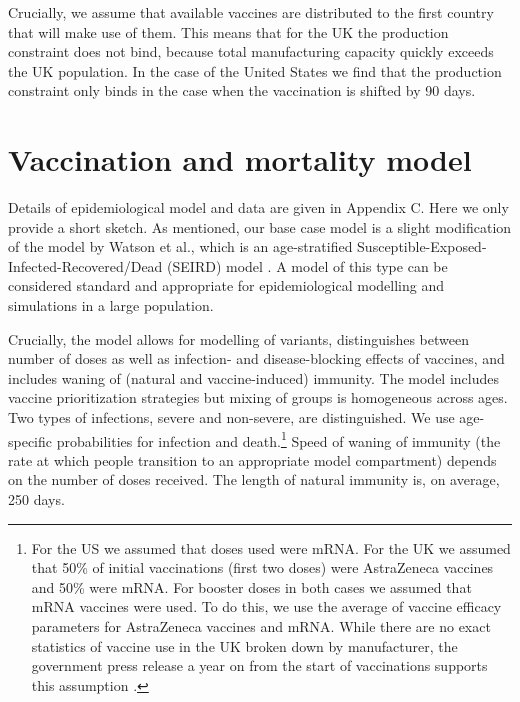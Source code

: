 \documentclass{article}
\begin{document}
Crucially, we assume that available vaccines are distributed to the first country that will make use of them. This means that for the UK the production constraint does not bind, because total manufacturing capacity quickly exceeds the UK population. In the case of the United States we find that the production constraint only binds in the case when the vaccination is shifted by 90 days.

\section{Vaccination and mortality model}\label{vaccination-and-mortality-model}

Details of epidemiological model and data are given in Appendix C. Here we only provide a short sketch. As mentioned, our base case model is a slight modification of the model by Watson et al., which is an age-stratified Susceptible-Exposed-Infected-Recovered/Dead (SEIRD) model \citep{watsonGlobalImpactFirst2022}. A model of this type can be considered standard and appropriate for epidemiological modelling and simulations in a large population.

Crucially, the model allows for modelling of variants, distinguishes between number of doses as well as infection- and disease-blocking effects of vaccines, and includes waning of (natural and vaccine-induced) immunity. The model includes vaccine prioritization strategies but mixing of groups is homogeneous across ages. Two types of infections, severe and non-severe, are distinguished. We use age-specific probabilities for infection and death.\footnote{For the US we assumed that doses used were mRNA. For the UK we assumed that 50\% of initial vaccinations (first two doses) were AstraZeneca vaccines and 50\% were mRNA. For booster doses in both cases we assumed that mRNA vaccines were used. To do this, we use the average of vaccine efficacy parameters for AstraZeneca vaccines and mRNA. While there are no exact statistics of vaccine use in the UK broken down by manufacturer, the government press release a year on from the start of vaccinations supports this assumption \citep{UK2022One}.} Speed of waning of immunity (the rate at which people transition to an appropriate model compartment) depends on the number of doses received. The length of natural immunity is, on average, 250 days.
\end{document}
